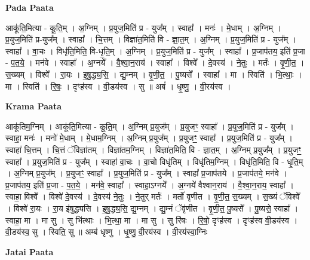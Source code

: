 \documentclass[17pt]{extarticle}
\begin{document}
\textbf{Pada Paata} \newline

आकू॑ति॒मित्या - कू॒ति॒म् । अ॒ग्निम् । प्र॒युज॒मिति॑ प्र - युज᳚म् । स्वाहा᳚ । मनः॑ । मे॒धाम् । अ॒ग्निम् । प्र॒युज॒मिति॑ प्र-युज᳚म् । स्वाहा᳚ । चि॒त्तम् । विज्ञा॑त॒मिति॑ वि - ज्ञा॒त॒म् । अ॒ग्निम् । प्र॒युज॒मिति॑ प्र - युज᳚म् । स्वाहा᳚ । वा॒चः । विधृ॑ति॒मिति॒ वि-धृ॒ति॒म् । अ॒ग्निम् । प्र॒युज॒मिति॑ प्र - युज᳚म् । स्वाहा᳚ । प्र॒जाप॑तय॒ इति॑ प्र॒जा - प॒त॒ये॒ । मन॑वे । स्वाहा᳚ । अ॒ग्नये᳚ । वै॒श्वा॒न॒राय॑ । स्वाहा᳚ । विश्वे᳚ । दे॒वस्य॑ । ने॒तुः । मर्तः॑ । वृ॒णी॒त॒ । स॒ख्यम् । विश्वे᳚ । रा॒यः । इ॒षु॒द्ध्य॒सि॒ । द्यु॒म्नम् । वृ॒णी॒त॒ । पु॒ष्यसे᳚ । स्वाहा᳚ । मा । स्विति॑ । भि॒त्थाः॒ । मा । स्विति॑ । रि॒षः॒ । दृꣳह॑स्व । वी॒डय॑स्व । सु ॥ अबं॑ । धृ॒ष्णु॒ । वी॒रय॑स्व ।  \newline


\textbf{Krama Paata} \newline

आकू॑तिम॒ग्निम् । आकू॑ति॒मित्या - कू॒ति॒म् । अ॒ग्निम् प्र॒युज᳚म् । प्र॒युजꣳ॒॒ स्वाहा᳚ । प्र॒युज॒मिति॑ प्र - युज᳚म् । स्वाहा॒ मनः॑ । मनो॑ मे॒धाम् । मे॒धाम॒ग्निम् । अ॒ग्निम् प्र॒युज᳚म् । प्र॒युजꣳ॒॒ स्वाहा᳚ । प्र॒युज॒मिति॑ प्र - युज᳚म् । स्वाहा॑ चि॒त्तम् । चि॒त्तं ॅविज्ञा॑तम् । विज्ञा॑तम॒ग्निम् । विज्ञा॑त॒मिति॒ वि - ज्ञा॒त॒म् । अ॒ग्निम् प्र॒युज᳚म् । प्र॒युजꣳ॒॒ स्वाहा᳚ । प्र॒युज॒मिति॑ प्र - युज᳚म् । स्वाहा॑ वा॒चः । वा॒चो विधृ॑तिम् । विधृ॑तिम॒ग्निम् । विधृ॑ति॒मिति॒ वि - धृ॒ति॒म् । अ॒ग्निम् प्र॒युज᳚म् । प्र॒युजꣳ॒॒ स्वाहा᳚ । प्र॒युज॒मिति॑ प्र - युज᳚म् । स्वाहा᳚ प्र॒जाप॑तये । प्र॒जाप॑तये॒ मन॑वे । प्र॒जाप॑तय॒ इति॑ प्र॒जा - प॒त॒ये॒ । मन॑वे॒ स्वाहा᳚ । स्वाहा॒ऽग्नये᳚ । अ॒ग्नये॑ वैश्वान॒राय॑ । वै॒श्वा॒न॒राय॒ स्वाहा᳚ । स्वाहा॒ विश्वे᳚ । विश्वे॑ दे॒वस्य॑ । दे॒वस्य॑ ने॒तुः । ने॒तुर् मर्तः॑ । मर्तो॑ वृणीत । वृ॒णी॒त॒ स॒ख्यम् । स॒ख्यं ॅविश्वे᳚ । विश्वे॑ रा॒यः । रा॒य इ॑षुद्ध्यसि । इ॒षु॒द्ध्य॒सि॒ द्यु॒म्नम् । द्यु॒म्नं ॅवृ॑णीत । वृ॒णी॒त॒ पु॒ष्यसे᳚ । पु॒ष्यसे॒ स्वाहा᳚ । स्वाहा॒ मा । मा सु । सु भि॑त्थाः । भि॒त्था॒ मा । मा सु । सु रि॑षः । रि॒षो॒ दृꣳह॑स्व । दृꣳह॑स्व वी॒डय॑स्व । वी॒डय॑स्व॒ सु । स्विति॒ सु ॥ अम्ब॑ धृष्णु । धृ॒ष्णु॒ वी॒रय॑स्व । वी॒रय॑स्वा॒ग्निः \newline

\textbf{Jatai Paata} \newline
\end{document}
